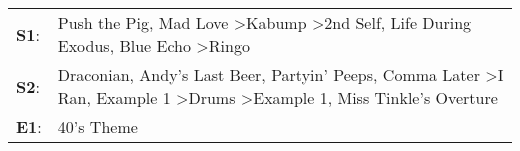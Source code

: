 \begin{supertabular}{p{0.03\textwidth}p{0.92\textwidth}}
 \textbf{S1}:  &                                                                                              Push the Pig\textsuperscript{}, \enspace Mad Love\textsuperscript{} \textgreater \enspace Kabump\textsuperscript{} \textgreater \enspace 2nd Self\textsuperscript{}, \enspace Life During Exodus\textsuperscript{}, \enspace Blue Echo\textsuperscript{} \textgreater \enspace Ringo\textsuperscript{}  \enspace  \\
 \textbf{S2}:  &  Draconian\textsuperscript{}, \enspace Andy's Last Beer\textsuperscript{}, \enspace Partyin' Peeps\textsuperscript{}, \enspace Comma Later\textsuperscript{} \textgreater \enspace I Ran\textsuperscript{}, \enspace Example 1\textsuperscript{} \textgreater \enspace Drums\textsuperscript{} \textgreater \enspace Example 1\textsuperscript{}, \enspace Miss Tinkle's Overture\textsuperscript{}  \enspace  \\
 \textbf{E1}:  &                                                                                                                                                                                                                                                                                                                                                                        40's Theme\textsuperscript{}  \enspace  \\
\end{supertabular}
